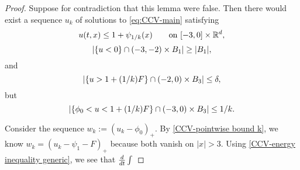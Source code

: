 \begin{proof}
Suppose for contradiction that this lemma were false.  Then there would exist a sequence $u_k$ of solutions to \eqref{eq:CCV-main} satisfying 
\begin{equation} \label{CCV-pointwise bound k}
u(t,x) \leq 1 + \psi_{1/k}(x) \qquad \textrm{on } [-3,0]\times\mathbb{R}^d, 
\end{equation}
\[ \left\lvert \{u < 0\} \cap (-3,-2)\times B_1 \right\rvert \geq |B_1|, \]
and
\[ \left\lvert \{u > 1 + (1/k)F\} \cap (-2,0)\times B_3 \right\rvert \leq \delta, \]
but
\[ \left\lvert \{\phi_0 < u < 1 + (1/k)F\} \cap (-3,0)\times B_3 \right\rvert \leq 1/k. \]

Consider the sequence $w_k := (u_k - \phi_0)_+$.  By \eqref{CCV-pointwise bound k}, we know $w_k = (u_k - \psi_1 - F)_+$ because both vanish on $|x|>3$.  Using \eqref{CCV-energy inequality generic}, we see that $\frac{d}{dt} \int $
\end{proof}

